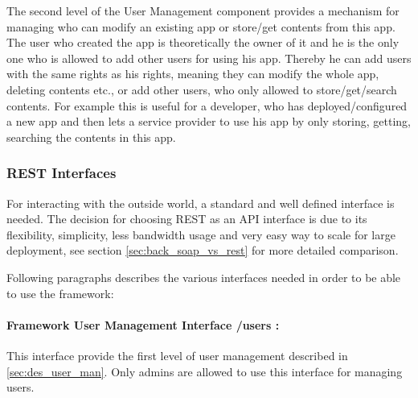 The second level of the User Management component provides a mechanism for managing who can modify an existing app or store/get contents from this app. The user who created the app is theoretically the owner of it and he is the only one who is allowed to add other users for using his app. Thereby he can add users with the same rights as his rights, meaning they can modify the whole app, deleting contents etc., or add other users, who only allowed to store/get/search contents. For example this is useful for a developer, who has deployed/configured a new app and then lets a service provider to use his app by only storing, getting, searching the contents in this app. 

\subsubsection{REST Interfaces \label{sec:des_rest_api}} For interacting with the outside world, a standard and well defined interface is needed. The decision for choosing REST as an API interface is due to its flexibility, simplicity, less bandwidth usage and very easy way to scale for large deployment, see section \ref{sec:back_soap_vs_rest} for more detailed comparison.

Following paragraphs describes the various interfaces needed in order to be able to use the framework:

\paragraph{Framework User Management Interface /users :} This interface provide the first level of user management described in \ref{sec:des_user_man}. Only admins are allowed to use this interface for managing users.

